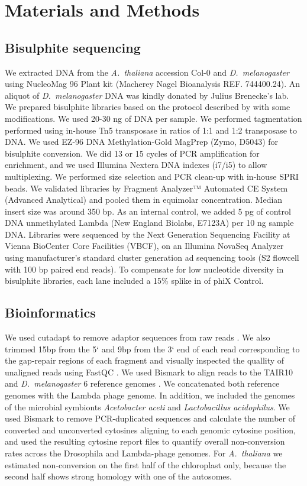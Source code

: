 \documentclass[twocolumn,twoside,lettersize]{article}
\begin{document}
\section{Materials and Methods}

\subsection{Bisulphite sequencing}

We extracted DNA from the \textit{A.~thaliana} accession Col-0 and \textit{D.~melanogaster} using NucleoMag 96 Plant kit (Macherey Nagel Bioanalysis REF. 744400.24).
An aliquot of \textit{D.~melanogaster} DNA was kindly donated by Julius Brenecke’s lab.
We prepared bisulphite libraries based on the protocol described by \textcite{weichenhan2019generation} with some modifications.
We used 20-30 ng of DNA per sample.
We performed tagmentation performed using in-house Tn5 transposase in ratios of 1:1 and 1:2 transposase to DNA.
We used EZ-96 DNA Methylation-Gold MagPrep (Zymo, D5043) for bisulphite conversion.
We did 13 or 15 cycles of PCR amplification for enrichment, and we used Illumina Nextera DNA indexes (i7/i5) to allow multiplexing.
We performed size selection and PCR clean-up with in-house SPRI beads.
We validated libraries by Fragment Analyzer™ Automated CE System (Advanced Analytical) and pooled them in equimolar concentration.
Median insert size was around 350 bp.
As an internal control, we added 5 pg of control DNA unmethylated Lambda (New England Biolabs, E7123A) per 10 ng sample DNA. 
Libraries were sequenced by the Next Generation Sequencing Facility at Vienna BioCenter Core Facilities (VBCF), on an Illumina NovaSeq Analyzer using manufacturer’s standard cluster generation ad sequencing tools (S2 flowcell with 100 bp paired end reads).
To compensate for low nucleotide diversity in bisulphite libraries, each lane included a 15\% splike in of phiX Control.

\subsection{Bioinformatics}

We used cutadapt to remove adaptor sequences from raw reads \parencite{martin2011cutadapt}.
We also trimmed 15bp from the 5` and 9bp from the 3` end of each read corresponding to the gap-repair regions of each fragment and visually inspected the quallity of unaligned reads using FastQC \parencite{andrews2020fastqc}.
We used Bismark to align reads to the TAIR10 and \textit{D.~melanogaster} 6 reference genomes \parencite{krueger2011bismark}.
We concatenated both reference genomes with the Lambda phage genome.
In addition, we included the genomes of the microbial symbionts \textit{Acetobacter aceti} and \textit{Lactobacillus acidophilus}.
We used Bismark to remove PCR-duplicated sequences and calculate the number of converted and unconverted cytosines aligning to each genomic cytosine position, and used the resulting cytosine report files to quantify overall non-conversion rates across the Drosophila and Lambda-phage genomes.
For \emph{A.~thaliana} we estimated non-conversion on the first half of the chloroplast only, because the second half shows strong homology with one of the autosomes.
\end{document}
